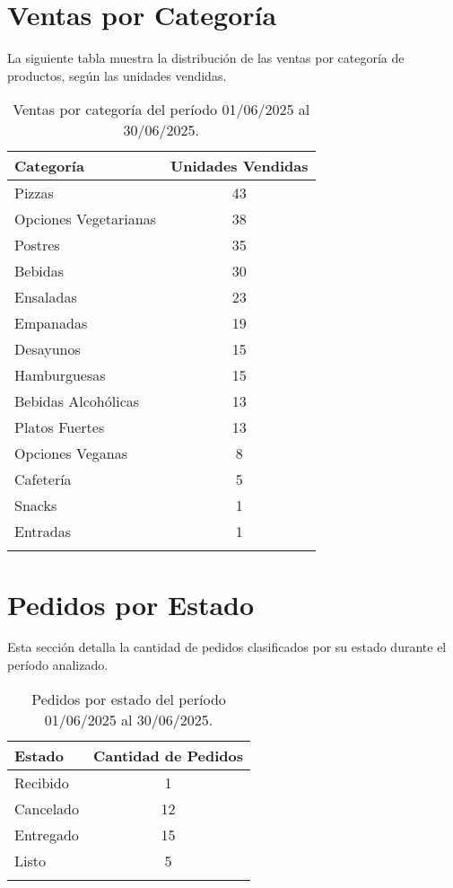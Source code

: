 \documentclass[a4paper,11pt]{article}
\begin{document}
\section{Ventas por Categoría}
La siguiente tabla muestra la distribución de las ventas por categoría de productos, según las unidades vendidas.

\begin{longtable}{lc}
    \toprule
    \textbf{Categoría} & \textbf{Unidades Vendidas} \\
    \midrule
            Pizzas & 43 \\
            Opciones Vegetarianas & 38 \\
            Postres & 35 \\
            Bebidas & 30 \\
            Ensaladas & 23 \\
            Empanadas & 19 \\
            Desayunos & 15 \\
            Hamburguesas & 15 \\
            Bebidas Alcohólicas & 13 \\
            Platos Fuertes & 13 \\
            Opciones Veganas & 8 \\
            Cafetería & 5 \\
            Snacks & 1 \\
            Entradas & 1 \\
        \bottomrule
    \caption{Ventas por categoría del período 01/06/2025 al 30/06/2025.}
    \label{tab:ventas_por_categoria}
\end{longtable}

\section{Pedidos por Estado}
Esta sección detalla la cantidad de pedidos clasificados por su estado durante el período analizado.

\begin{longtable}{lc}
    \toprule
    \textbf{Estado} & \textbf{Cantidad de Pedidos} \\
    \midrule
            Recibido & 1 \\
            Cancelado & 12 \\
            Entregado & 15 \\
            Listo & 5 \\
        \bottomrule
    \caption{Pedidos por estado del período 01/06/2025 al 30/06/2025.}
    \label{tab:pedidos_por_estado}
\end{longtable}
\end{document}
